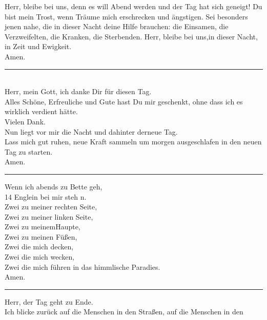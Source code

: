 Herr, bleibe bei uns, denn es will Abend werden und der Tag hat sich geneigt! Du bist mein Trost, wenn Träume mich erschrecken und ängstigen.  Sei besonders jenen nahe, die in dieser Nacht deine Hilfe brauchen: die Einsamen, die Verzweifelten, die Kranken, die Sterbenden.  Herr, bleibe bei uns,in dieser Nacht, in Zeit und Ewigkeit. \\ \newline
Amen.\\
\par\noindent\rule{\textwidth}{0.4pt} \newline \newline
\\
Herr, mein Gott, ich danke Dir für diesen Tag.\\ 
Alles Schöne, Erfreuliche und Gute hast Du mir geschenkt, ohne dass ich es wirklich verdient hätte.\\
Vielen Dank.\\
Nun liegt vor mir die Nacht und dahinter derneue Tag.\\
Lass mich gut ruhen, neue Kraft sammeln um morgen ausgeschlafen in den neuen Tag zu starten.\\ \newline
Amen.\\
\par\noindent\rule{\textwidth}{0.4pt} \newline \newline
Wenn ich abends zu Bette geh,\\
14 Englein bei mir steh n.\\
Zwei zu meiner rechten Seite,\\
Zwei zu meiner linken Seite,  \\
Zwei zu meinemHaupte, \\
Zwei zu meinen Füßen,\\
Zwei die mich decken,\\
Zwei die mich wecken,\\
Zwei die mich führen in das himmlische Paradies.\\ \newline
Amen.\\
\par\noindent\rule{\textwidth}{0.4pt} \newline \newline
Herr, der Tag geht zu Ende.\\
Ich blicke zurück auf die Menschen in den Straßen, auf die Menschen in den\\
